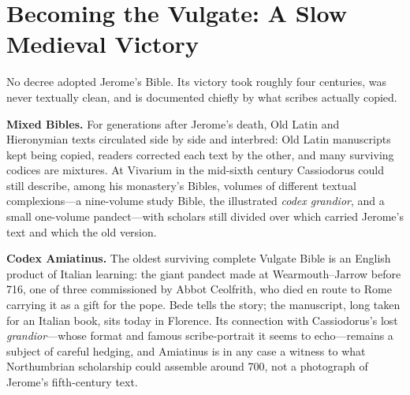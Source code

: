 \section{Becoming the Vulgate: A Slow Medieval Victory}

No decree adopted Jerome's Bible. Its victory took roughly four centuries,
was never textually clean, and is documented chiefly by what scribes
actually copied.

\textbf{Mixed Bibles.} For generations after Jerome's death, Old Latin and
Hieronymian texts circulated side by side and interbred: Old Latin
manuscripts kept being copied, readers corrected each text by the other,
and many surviving codices are mixtures. At Vivarium in the mid-sixth
century Cassiodorus could still describe, among his monastery's Bibles,
volumes of different textual complexions---a nine-volume study Bible, the
illustrated \textit{codex grandior}, and a small one-volume pandect---with
scholars still divided over which carried Jerome's text and which the old
version.

\textbf{Codex Amiatinus.} The oldest surviving complete Vulgate Bible is
an English product of Italian learning: the giant pandect made at
Wearmouth--Jarrow before 716, one of three commissioned by Abbot
Ceolfrith, who died en route to Rome carrying it as a gift for the pope.
Bede tells the story; the manuscript, long taken for an Italian book, sits
today in Florence. Its connection with Cassiodorus's lost
\textit{grandior}---whose format and famous scribe-portrait it seems to
echo---remains a subject of careful hedging, and Amiatinus is in any case
a witness to what Northumbrian scholarship could assemble around 700, not
a photograph of Jerome's fifth-century text.

